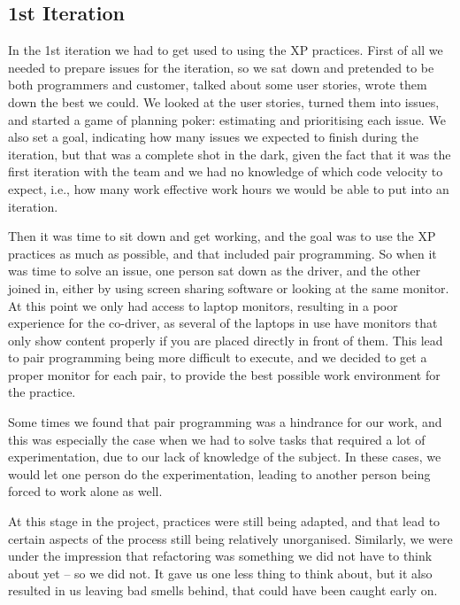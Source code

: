 \subsection{1st Iteration}
In the 1st iteration we had to get used to using the XP practices. First of all we needed to prepare issues for the iteration, so we sat down and pretended to be both programmers and customer, talked about some user stories, wrote them down the best we could. We looked at the user stories, turned them into issues, and started a game of planning poker: estimating and prioritising each issue. We also set a goal, indicating how many issues we expected to finish during the iteration, but that was a complete shot in the dark, given the fact that it was the first iteration with the team and we had no knowledge of which code velocity to expect, i.e., how many work effective work hours we would be able to put into an iteration.

Then it was time to sit down and get working, and the goal was to use the XP practices as much as possible, and that included pair programming. So when it was time to solve an issue, one person sat down as the driver, and the other joined in, either by using screen sharing software or looking at the same monitor. At this point we only had access to laptop monitors, resulting in a poor experience for the co-driver, as several of the laptops in use have monitors that only show content properly if you are placed directly in front of them.
This lead to pair programming being more difficult to execute, and we decided to get a proper monitor for each pair, to provide the best possible work environment for the practice. %

Some times we found that pair programming was a hindrance for our work, and this was especially the case when we had to solve tasks that required a lot of experimentation, due to our lack of knowledge of the subject. In these cases, we would let one person do the experimentation, leading to another person being forced to work alone as well.

At this stage in the project, practices were still being adapted, and that lead to certain aspects of the process still being relatively unorganised. Similarly, we were under the impression that refactoring was something we did not have to think about yet -- so we did not. It gave us one less thing to think about, but it also resulted in us leaving bad smells behind, that could have been caught early on.

